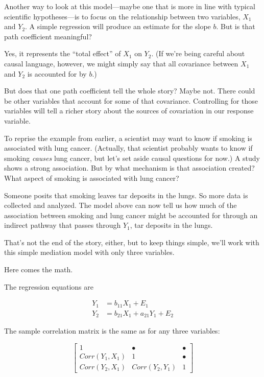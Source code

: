 \documentclass[
]{book}
\begin{document}
Another way to look at this model---maybe one that is more in line with typical scientific hypotheses---is to focus on the relationship between two variables, \(X_{1}\) and \(Y_{2}\). A simple regression will produce an estimate for the slope \(b\). But is that path coefficient meaningful?

Yes, it represents the ``total effect'' of \(X_{1}\) on \(Y_{2}\). (If we're being careful about causal language, however, we might simply say that all covariance between \(X_{1}\) and \(Y_{2}\) is accounted for by \(b\).)

But does that one path coefficient tell the whole story? Maybe not. There could be other variables that account for some of that covariance. Controlling for those variables will tell a richer story about the sources of covariation in our response variable.

To reprise the example from earlier, a scientist may want to know if smoking is associated with lung cancer. (Actually, that scientist probably wants to know if smoking \emph{causes} lung cancer, but let's set aside causal questions for now.) A study shows a strong association. But by what mechanism is that association created? What aspect of smoking is associated with lung cancer?

Someone posits that smoking leaves tar deposits in the lungs. So more data is collected and analyzed. The model above can now tell us how much of the association between smoking and lung cancer might be accounted for through an indirect pathway that passes through \(Y_{1}\), tar deposits in the lungs.

That's not the end of the story, either, but to keep things simple, we'll work with this simple mediation model with only three variables.

Here comes the math.

The regression equations are

\begin{align}
Y_{1}   &= b_{11}X_{1} + E_{1}              \\
Y_{2}   &= b_{21}X_{1} + a_{21}Y_{1} + E_{2}  
\end{align}

The sample correlation matrix is the same as for any three variables:

\[
\begin{bmatrix}
1                   &   \bullet             &   \bullet \\
Corr(Y_{1}, X_{1})  &   1                   &   \bullet \\
Corr(Y_{2}, X_{1})  &   Corr(Y_{2}, Y_{1})   &   1
\end{bmatrix}
\]
\end{document}
